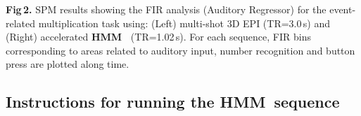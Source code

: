 \documentclass[12pt,twoside]{article}
\newcommand{\HMM}{{\color{darkred}\textbf{\textsf{HMM\ }}}}
\begin{document}
\vfill


\newpage

\noindent{}

\noindent\parbox[b]{160mm}{\small\textsf{\textbf{Fig\,2.} SPM results
    showing the FIR analysis (Auditory Regressor) for the
    event-related multiplication task using: (Left) multi-shot 3D EPI
    (TR=3.0\,s) and (Right) {\color{studyblue}accelerated \HMM
      (TR=1.02\,s)}. For each sequence, FIR bins corresponding to
    areas related to auditory input, number recognition and button
    press are plotted along time.}}

\begin{spacing}{1}




\section{Instructions for running the \HMM sequence}


\end{spacing}




\newpage

\cleartooddpage\rule{0mm}{0mm}
\fancyhead[RO]{\textsf{\small{\textbf{\color{studyblue}\thepage/\pageref{LastPage}}}}}
\fancyhead[LE]{\textsf{\small{\textbf{\color{studyblue}\thepage/\pageref{LastPage}}}}}
\cleartooddpage
\end{document}
